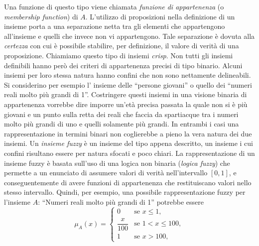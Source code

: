 \documentclass [11pt,a4paper,twoside,openright] {book}
\begin{document}
Una funzione di questo tipo viene chiamata \textit{funzione di appartenenza} (o \textit{membership function}) di $A$. L'utilizzo di proposizioni nella definizione di un insieme porta a una separazione netta tra gli elementi che appartengono all'insieme e quelli che invece non vi appartengono. Tale separazione è dovuta alla \textit{certezza} con cui è possibile stabilire, per definizione, il valore di verità di una proposizione. Chiamiamo questo tipo di insiemi \textit{crisp}. Non tutti gli insiemi definibili hanno però dei criteri di appartenenza precisi di tipo binario. Alcuni insiemi per loro stessa natura hanno confini che non sono nettamente delineabili. Si considerino per esempio l' insieme delle ``persone giovani'' o quello dei ``numeri reali molto più grandi di 1''. Costringere questi insiemi in una visione binaria di appartenenza vorrebbe dire imporre un'età precisa passata la quale non si è più giovani e un punto sulla retta dei reali che faccia da spartiacque tra i numeri molto più grandi di uno e quelli solamente più grandi. In entrambi i casi una rappresentazione in termini binari non coglierebbe a pieno la vera natura dei due insiemi. Un \textit{insieme fuzzy} è un insieme del tipo appena descritto, un insieme i cui confini risultano essere per natura sfocati e poco chiari. La rappresentazione di un insieme fuzzy è basata sull'uso di una logica non binaria (\textit{logica fuzzy}) che permette a un enunciato di assumere valori di verità nell'intervallo $[0, 1]$, e conseguentemente di avere funzioni di appartenenza che restituiscano valori nello stesso intervallo. Quindi, per esempio, una possibile rappresentazione fuzzy per l'insieme $A$: ``Numeri reali molto più grandi di 1'' potrebbe essere
\begin{equation}
\mu_{A}(x)=
\begin{cases}
0 & \text{se } x \leq 1 ,\\
\dfrac{x}{100} & \text{se }1 <  x \leq 100 ,\\
1 & \text{se } x > 100,
\end{cases}
\end{equation}
\end{document}
